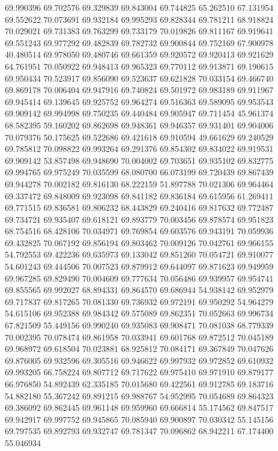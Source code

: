69.990396
69.702576
69.329839
69.843004
69.744825
65.262510
67.131954
69.552622
70.073691
69.932184
69.995293
69.828344
69.781211
68.918824
70.029021
69.731383
69.763299
69.733179
70.019826
69.811167
69.919641
69.551243
69.977292
69.482839
69.782732
69.900844
69.752169
67.900978
40.480514
69.978050
69.480746
69.661359
69.920572
69.920413
69.921629
64.761951
70.050922
69.948413
69.965323
69.770112
69.913871
69.190615
69.950434
70.523917
69.856090
69.523637
69.621828
70.033154
69.466740
69.869178
70.006404
69.947916
69.740824
69.501972
69.983189
69.911967
69.945414
69.139645
69.925752
69.964274
69.516363
69.589095
69.953543
69.909142
69.994998
69.750235
69.440484
69.905947
69.711454
45.961374
68.582395
59.160202
69.862698
69.948361
69.946357
69.931401
69.904006
70.079376
50.175625
69.522686
69.421618
69.910594
49.661629
69.240529
69.785812
70.098822
69.993264
69.291376
69.854302
69.834022
69.919531
69.909142
53.857498
69.948690
70.004002
69.703651
69.935102
69.832775
69.994765
69.975249
70.035599
68.080700
66.073199
69.720439
69.867439
69.944278
70.002182
69.816130
68.222159
51.897788
70.021306
69.964464
69.337472
69.848009
69.923098
69.841182
69.836184
69.615956
61.269411
69.771515
69.836581
69.806232
68.443829
69.240416
69.817632
69.772487
69.734721
69.935407
69.618121
69.893779
70.003456
69.878574
69.951823
68.754516
68.428106
70.034971
69.769854
69.603576
69.943191
70.059936
69.432825
70.067192
69.856194
69.803462
70.009126
70.042761
69.966155
54.792553
69.422236
69.635973
69.133042
69.851260
70.054721
69.910077
54.601243
69.444506
70.007523
69.879912
69.644097
69.871623
69.949959
69.967285
69.829490
70.004609
69.777634
70.056486
69.939957
69.954741
69.855565
69.992027
68.894331
69.864570
69.686944
54.938142
69.952979
69.717837
69.817265
70.081330
69.736932
69.972191
69.950292
54.964279
54.615106
69.952388
69.984342
69.575089
69.862351
70.052663
69.996734
67.821509
55.449156
69.990240
69.935083
69.908471
70.081038
68.779339
70.002395
70.078474
69.861958
70.033941
69.601768
69.872512
70.045189
69.968972
69.618504
70.023881
68.925812
70.084171
69.367849
70.047626
69.876005
69.932596
69.305516
69.946622
69.997932
69.972852
69.610932
69.993205
66.758224
69.807712
69.717622
69.975410
69.971910
69.879177
66.976850
54.892439
62.335185
70.015680
69.422561
69.912785
69.183716
54.882180
55.367242
69.891215
69.988767
54.952995
70.054689
69.864323
69.386092
69.862445
69.961148
69.959960
69.666814
55.174562
69.847517
69.942917
69.997752
69.945865
70.085940
69.900897
70.030342
55.145156
69.797535
69.892793
69.932747
69.781347
70.096862
68.942211
67.174400
55.046934
